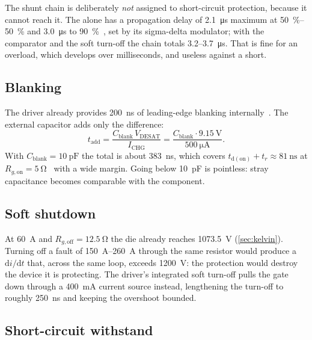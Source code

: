 The shunt chain is deliberately \emph{not} assigned to short-circuit
protection, because it cannot reach it. The \isoamp{} alone has a
propagation delay of \SI{2.1}{\micro\second} maximum at
\SI{50}{\percent}--\SI{50}{\percent} and \SI{3.0}{\micro\second} to
\SI{90}{\percent}~\cite{ti_amc1302}, set by its sigma-delta modulator; with
the comparator and the soft turn-off the chain totals
\SI{3.2}{}--\SI{3.7}{\micro\second}. That is fine for an overload, which
develops over milliseconds, and useless against a short.

\subsection{Blanking}

The driver already provides \SI{200}{\nano\second} of leading-edge blanking
internally~\cite{ti_ucc21750}. The external capacitor adds only the
difference:
%
\begin{equation}
  t_\mathrm{add} = \frac{C_\mathrm{blank}\,V_\mathrm{DESAT}}{I_\mathrm{CHG}}
  = \frac{C_\mathrm{blank}\cdot\SI{9.15}{\volt}}{\SI{500}{\micro\ampere}} .
\end{equation}
%
With $C_\mathrm{blank} = \SI{10}{\pico\farad}$ the total is about
\SI{383}{\nano\second}, which covers
$t_\mathrm{d(on)} + t_r \approx \SI{81}{\nano\second}$ at
$R_{g,\mathrm{on}} = \SI{5}{\ohm}$~\cite{wolfspeed_e3m0016} with a wide
margin. Going
below \SI{10}{\pico\farad} is pointless: stray capacitance becomes
comparable with the component.

\subsection{Soft shutdown}

At \SI{60}{\ampere} and $R_{g,\mathrm{off}} = \SI{12.5}{\ohm}$ the die already
reaches \SI{1073.5}{\volt} (\cref{sec:kelvin}). Turning off a fault of
\SIrange{150}{260}{\ampere} through the same resistor would produce a
$\mathrm{d}i/\mathrm{d}t$ that, across the same loop, exceeds
\SI{1200}{\volt}: the protection would destroy the device it is protecting.
The driver's integrated soft turn-off pulls the gate down through a
\SI{400}{\milli\ampere} current source instead, lengthening the turn-off to
roughly \SI{250}{\nano\second} and keeping the overshoot bounded.

\subsection{Short-circuit withstand}
\label{sec:tsc}

